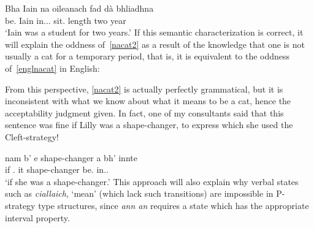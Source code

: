 \documentclass[output=paper]{langsci/langscibook}
\begin{document}
\ea {}
\sn \gll  Bha Iain na oileanach fad d\`a bhliadhna\\
be.\Pst{} Iain in.\Poss.\Tsg.\M{} sit.\Vn{} length two year\\
\glt \enquote*{Iain was a student for two years.}
\z
If this semantic characterization is correct, it will explain the oddness
of~\eqref{nacat2} as a result of the knowledge that one is not usually a cat for a
temporary period, that is, it is equivalent to the oddness of~\eqref{englnacat} in
English:

\label{nacat2}
\z

\label{englnacat}
\z
From this perspective, \eqref{nacat2} is actually perfectly grammatical, but it is
inconsistent with what we know about what it means to be a cat, hence the
acceptability judgment given. In fact, one of my consultants said that this
sentence was fine if Lilly was a shape-changer, to express which she used the
Cleft-strategy!

\ea {}
\sn \gll  nam b' e shape-changer a bh' innte\\
if \Cop.\Cond{} it shape-changer \Rel{} be.\Pst{} in.\Tsg.\glossF{}\\
\glt \enquote*{if she was a shape-changer.}
\z
This approach will also explain why verbal states such as \emph{ciallaich},
`mean' (which lack such transitions) are impossible in P-strategy type
structures, since \emph{ann an} requires a state which has the appropriate
interval property.

%
%
%
\end{document}
